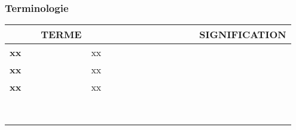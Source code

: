 \newpage

\def\termea{\bf \footnotesize xx}
\def\sensa{\footnotesize xx}

\def\termeb{\bf \footnotesize xx}
\def\sensb{\footnotesize xx}

\def\termec{\bf \footnotesize xx}
\def\sensc{\footnotesize xx}

\def\termed{\bf \footnotesize }
\def\sensd{\footnotesize }

\def\termee{\bf \footnotesize }
\def\sense{\footnotesize }

\def\termef{\bf \footnotesize }
\def\sensf{\footnotesize }

\def\termeg{\bf \footnotesize }
\def\sensg{\footnotesize }

\def\termeh{\bf \footnotesize }
\def\sensh{\footnotesize }

\def\termei{\bf \footnotesize }
\def\sensi{\footnotesize }

\def\termej{\bf \footnotesize }
\def\sensj{\footnotesize }

\def\termek{\bf \footnotesize }
\def\sensk{\footnotesize }



\begin{center}
\subsubsection*{Terminologie}
\begin{tabular}{|p{5cm}|p{12cm}|}
\hline
{\bf ~~~~~ T{\scriptsize ERME}} &  {\bf ~~~~~~~~~~~~~~~~~~~ S{\scriptsize IGNIFICATION}}\\
\hline
\hline
\termea & \sensa\\
\hline
\termeb & \sensb\\
\hline
\termec & \sensc\\
\hline
\termed & \sensd\\
\hline
\termee & \sense\\
\hline
\termef & \sensf\\
\hline
\termeg & \sensg\\
\hline
\termeh & \sensh\\
\hline
\termei & \sensi\\
\hline
\termej & \sensj\\
\hline
\termek & \sensk\\
\hline

\end{tabular}
 
\end{center}
